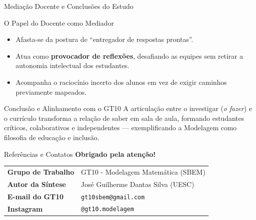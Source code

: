 \documentclass[10pt, aspectratio=169]{beamer}
\begin{document}
\begin{frame}{Mediação Docente e Conclusões do Estudo}
    \transsplithorizontalout[duration=0.4]
    \begin{block}{O Papel do Docente como Mediador}
        \begin{itemize}
            \item Afasta-se da postura de ``entregador de respostas prontas''.
            \pause
            \item Atua como \textbf{provocador de reflexões}, desafiando as equipes sem retirar a autonomia intelectual dos estudantes.
            \pause
            \item Acompanha o raciocínio incerto dos alunos em vez de exigir caminhos previamente mapeados.
        \end{itemize}
    \end{block}
    \pause
    \begin{alertblock}{Conclusão e Alinhamento com o GT10}
        A articulação entre o investigar (\emph{o fazer}) e o currículo transforma a relação de saber em sala de aula, formando estudantes críticos, colaborativos e independentes --- exemplificando a Modelagem como filosofia de educação e inclusão.
    \end{alertblock}
\end{frame}

\begin{frame}{Referências e Contatos}
    \transdissolve[duration=0.5]
    \centering
    {\Large \textbf{Obrigado pela atenção!}} \\[0.6cm]
    \normalsize
    \begin{tabular}{ll}
        \toprule
        \textbf{Grupo de Trabalho} & GT10 - Modelagem Matemática (SBEM) \\
        \textbf{Autor da Síntese} & José Guilherme Dantas Silva (UESC) \\
        \textbf{E-mail do GT10} & \texttt{gt10sbem@gmail.com} \\
        \textbf{Instagram} & \texttt{@gt10.modelagem} \\
        \bottomrule
    \end{tabular}
\end{frame}
\end{document}
